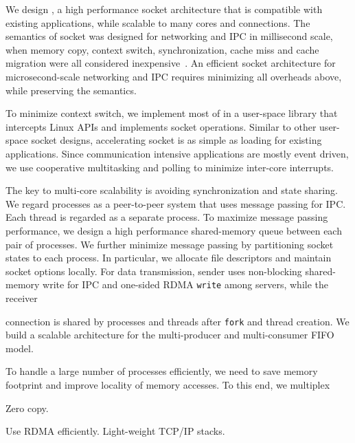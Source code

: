 


 


We design \sys{}, a high performance socket architecture that is compatible with existing applications, while scalable to many cores and connections. The semantics of socket was designed for networking and IPC in millisecond scale, when memory copy, context switch, synchronization, cache miss and cache migration were all considered inexpensive~\cite{barroso2017attack}. An efficient socket architecture for microsecond-scale networking and IPC requires minimizing all overheads above, while preserving the semantics.

To minimize context switch, we implement most of \sys{} in a user-space library \libipc{} that intercepts Linux APIs and implements socket operations. Similar to other user-space socket designs, accelerating socket is as simple as loading \libipc{} for existing applications. Since communication intensive applications are mostly event driven, we use cooperative multitasking and polling to minimize inter-core interrupts.

The key to multi-core scalability is avoiding synchronization and state sharing. We regard processes as a peer-to-peer system that uses message passing for IPC. Each thread is regarded as a separate process. To maximize message passing performance, we design a high performance shared-memory queue between each pair of processes. We further minimize message passing by partitioning socket states to each process. In particular, we allocate file descriptors and maintain socket options locally. For data transmission, sender uses non-blocking shared-memory write for IPC and one-sided RDMA \texttt{write} among servers, while the receiver 

connection is shared by processes and threads after \texttt{fork} and thread creation. We build a scalable architecture for the multi-producer and multi-consumer FIFO model.

To handle a large number of processes efficiently, we need to save memory footprint and improve locality of memory accesses. To this end, we multiplex

Zero copy.

Use RDMA efficiently. Light-weight TCP/IP stacks.
